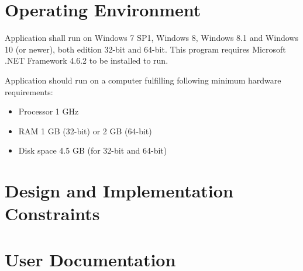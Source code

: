 \section{Operating Environment}

	\label{s:overall:environment}
	{
		Application shall run on Windows 7 SP1, Windows 8, Windows 8.1 and Windows 10 (or newer), both edition 32-bit and 64-bit. This program requires Microsoft .NET Framework 4.6.2 to be installed to run.
	}
	{
		Application should run on a computer fulfilling following minimum hardware requirements:
		\begin{itemize}
			\item Processor 1 GHz
			\item RAM 1 GB (32-bit) or 2 GB (64-bit)
			\item Disk space 4.5 GB (for 32-bit and 64-bit)
		\end{itemize}
	} 
\section{Design and Implementation Constraints}

\section{User Documentation}

